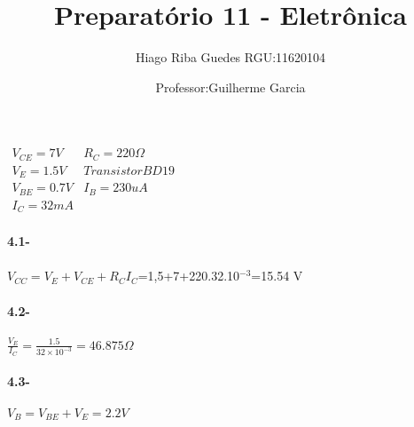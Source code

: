 \documentclass[11pt,a4paper]{article}
\title{Preparatório 11 - Eletrônica}
\author{Hiago Riba Guedes RGU:11620104}
\date{Professor:Guilherme Garcia}
\begin{document}
\maketitle
\begin{center}
$ {\begin{array}{cc}
   V_{CE}=7 V &R_{C}=220 \Omega     \\
   V_{E}=1.5 V & Transistor BD19 \\
   V_{BE}=0.7 V & I_{B}=230 uA    \\
   I_{C}=32 mA   \\
  \end{array} } $
   \end{center}
\textbf{4.1-}\\
\\
$V_{CC}=V_E+V_{CE}+R_CI_C$=1,5+7+220.32.10$^{-3}$=15.54 V
\\\\
\textbf{4.2-}\\\\
$\frac{V_E}{I_C}=\frac{1.5}{32 \times 10^{-3}}=46.875 \Omega$
\\\\
\textbf{4.3-} 
\\\\
$V_B=V_{BE}+V_E=2.2 V$\\
\end{document}
